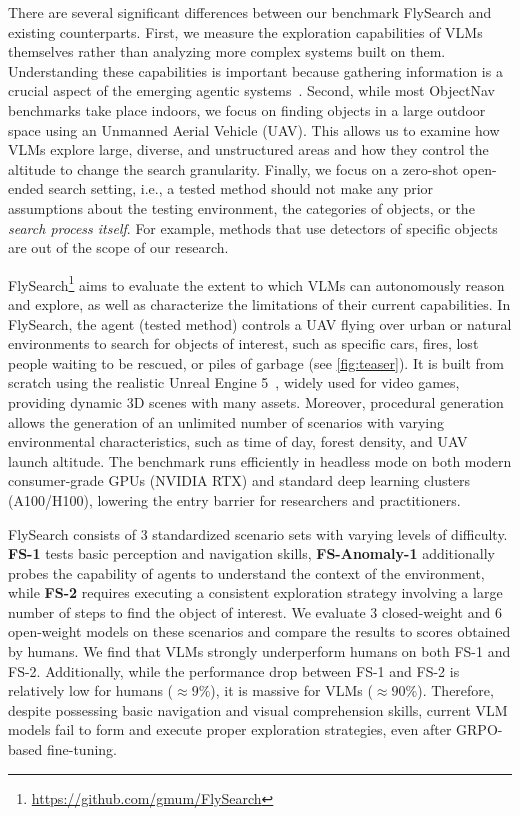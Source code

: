 \documentclass{article}
\theoremstyle{plain}
\theoremstyle{definition}
\theoremstyle{remark}
\newcommand{\ours}{FlySearch}
\newcommand{\challenge}{FS-1}
\newcommand{\anomalychallenge}{FS-Anomaly-1}
\newcommand{\hardchallenge}{FS-2}
\newcommand{\objectnav}{ObjectNav}
\begin{document}
There are several significant differences between our benchmark \ours{} and existing counterparts. First, we measure the exploration capabilities of VLMs themselves rather than analyzing more complex systems built on them. Understanding these capabilities is important because gathering information is a crucial aspect of the emerging agentic systems~\cite{paglieri2024balrog}. Second, while most \objectnav{} benchmarks take place indoors, we focus on finding objects in a large outdoor space using an Unmanned Aerial Vehicle (UAV). This allows us to examine how VLMs explore large, diverse, and unstructured areas and how they control the altitude to change the search granularity. Finally, we focus on a zero-shot open-ended search setting, i.e., a tested method should not make any prior assumptions about the testing environment, the categories of objects, or the \textit{search process itself}. For example, methods that use detectors of specific objects are out of the scope of our research.

\ours{}\footnote{\color{blue}\href{https://github.com/gmum/FlySearch}{https://github.com/gmum/FlySearch}} aims to evaluate the extent to which VLMs can autonomously reason and explore, as well as characterize the limitations of their current capabilities. In \ours{}, the agent (tested method) controls a UAV flying over urban or natural environments to search for objects of interest, such as specific cars, fires, lost people waiting to be rescued, or piles of garbage (see \cref{fig:teaser}).
It is built from scratch using the realistic Unreal Engine 5~\cite{unrealengine}, widely used for video games, providing dynamic 3D scenes with many assets. Moreover, procedural generation allows the generation of an unlimited number of scenarios with varying environmental characteristics, such as time of day, forest density, and UAV launch altitude. The benchmark runs efficiently in headless mode on both modern consumer-grade GPUs (NVIDIA RTX) and standard deep learning clusters (A100/H100), lowering the entry barrier for researchers and practitioners.

\ours{} consists of 3 standardized scenario sets with varying levels of difficulty. \textbf{\challenge{}} tests basic perception and navigation skills, \textbf{\anomalychallenge{}} additionally probes the capability of agents to understand the context of the environment, while \textbf{\hardchallenge{}} requires executing a consistent exploration strategy involving a large number of steps to find the object of interest.
We evaluate \(3\) closed-weight and \(6\) open-weight models on these scenarios and compare the results to scores obtained by humans. We find that VLMs strongly underperform humans on both \challenge{} and \hardchallenge{}. Additionally, while the performance drop between \challenge{} and \hardchallenge{} is relatively low for humans ($\approx 9\%$), it is massive for VLMs ($\approx 90\%$). Therefore, despite possessing basic navigation and visual comprehension skills, current VLM models fail to form and execute proper exploration strategies, even after GRPO-based fine-tuning.
\end{document}
